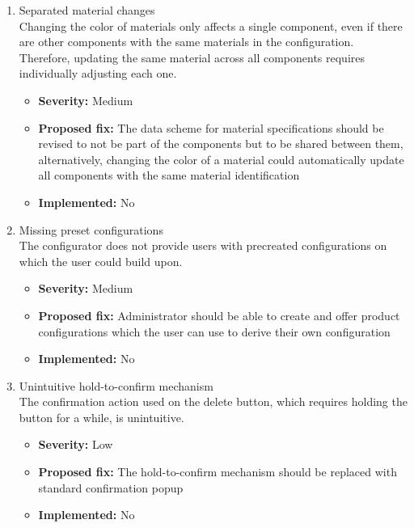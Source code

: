 \begin{enumerate}[label=\textbf{I\arabic*:}, leftmargin=27pt]
    \item Separated material changes
        \vspace{2pt}
        \\Changing the color of materials only affects a single component, even if there are other components with the same materials in the configuration. Therefore, updating the same material across all components requires \phantom{individually adjusting each one.}\newpage individually adjusting each one.
        \begin{itemize}[noitemsep, label=\trianglebullet]
            \item \textbf{Severity:} Medium
            \item \textbf{Proposed fix:} The data scheme for material specifications should be revised to not be part of the components but to be shared between them, alternatively, changing the color of a material could automatically update all components with the same material identification
            \item \textbf{Implemented:} No
        \end{itemize}
        \vspace{4pt}

    \item Missing preset configurations
        \vspace{2pt}
        \\The configurator does not provide users with precreated configurations on which the user could build upon.
        \begin{itemize}[noitemsep, label=\trianglebullet]
            \item \textbf{Severity:} Medium
            \item \textbf{Proposed fix:} Administrator should be able to create and offer product configurations which the user can use to derive their own configuration
            \item \textbf{Implemented:} No
        \end{itemize}
        \vspace{4pt}

    \item Unintuitive hold-to-confirm mechanism
        \vspace{2pt}
        \\The confirmation action used on the delete button, which requires holding the button for a while, is unintuitive.
        \begin{itemize}[noitemsep, label=\trianglebullet]
            \item \textbf{Severity:} Low
            \item \textbf{Proposed fix:} The hold-to-confirm mechanism should be replaced with standard confirmation popup
            \item \textbf{Implemented:} No
        \end{itemize}
        \vspace{4pt}


\end{enumerate}
